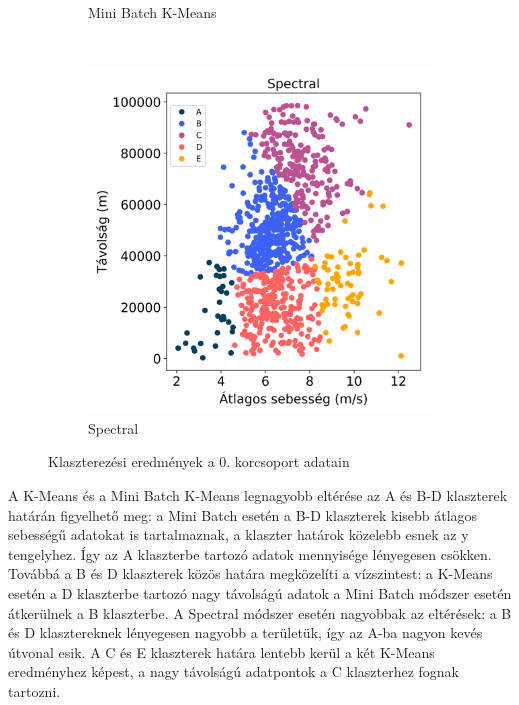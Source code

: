 \begin{figure}[!h]
\begin{subfigure}{.5\linewidth}
		\caption{Mini Batch K-Means}
		\label{subfig:clusteringAgeGroupNullMiniBatch}
	\end{subfigure}\\[1ex]
	\begin{subfigure}{.5\linewidth}
		\centering
		\includegraphics[width=\textwidth,keepaspectratio]{kepek/clustering/age_group_0_spectral_results.png}
		\caption{Spectral}
		\label{subfig:clusteringAgeGroupNullSpectral}
	\end{subfigure}
	\caption{Klaszterezési eredmények a 0. korcsoport adatain}
	\label{fig:clusteringAgeGroupNull}
\end{figure}

A K-Means és a Mini Batch K-Means legnagyobb eltérése az A és B-D klaszterek határán figyelhető meg: a Mini Batch esetén a B-D klaszterek kisebb átlagos sebességű adatokat is tartalmaznak, a klaszter határok közelebb esnek az y tengelyhez. Így az A klaszterbe tartozó adatok mennyisége lényegesen csökken. Továbbá a B és D klaszterek közös határa megközelíti a vízszintest: a K-Means esetén a D klaszterbe tartozó nagy távolságú adatok a Mini Batch módszer esetén átkerülnek a B klaszterbe. A Spectral módszer esetén nagyobbak az eltérések: a B és D klasztereknek lényegesen nagyobb a területük, így az A-ba nagyon kevés útvonal esik. A C és E klaszterek határa lentebb kerül a két K-Means eredményhez képest, a nagy távolságú adatpontok a C klaszterhez fognak tartozni.


